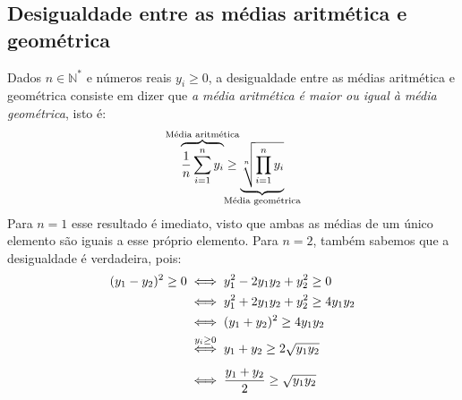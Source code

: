 \subsection*{Desigualdade entre as médias aritmética e geométrica}

Dados $n \in \mathds{N}^*$ e números reais $y_i \ge 0$,
a desigualdade entre as médias aritmética e geométrica
consiste em dizer que
\emph{a média aritmética é maior ou igual à média geométrica}, isto é:
\[
    \overbrace{
      \dfrac{1}{n} \sum_{i=1}^n y_i
    }^{\mathclap{\text{Média aritmética}}}
  \ge
    \underbrace{
      \sqrt[n]{\prod_{i=1}^n y_i}
    }_{\mathclap{\text{Média geométrica}}}
\]
Para $n = 1$ esse resultado é imediato,
visto que ambas as médias de um único elemento
são iguais a esse próprio elemento.
Para $n = 2$, também sabemos que a desigualdade é verdadeira, pois:
\begin{align*}
    (y_1 - y_2)^2 \ge 0
  &\iff
    y_1^2 - 2 y_1 y_2 + y_2^2 \ge 0
  \\&\iff
    y_1^2 + 2 y_1 y_2 + y_2^2 \ge 4 y_1 y_2
  \\&\iff
    (y_1 + y_2)^2 \ge 4 y_1 y_2
  \\&\stackrel{\rule[-.3em]{0pt}{0pt}y_i \ge 0}{\iff}\vphantom{\int}
    y_1 + y_2 \ge 2 \sqrt{y_1 y_2}
  \\&\iff
    \dfrac{y_1 + y_2}{2} \ge \sqrt{y_1 y_2}
\end{align*}

